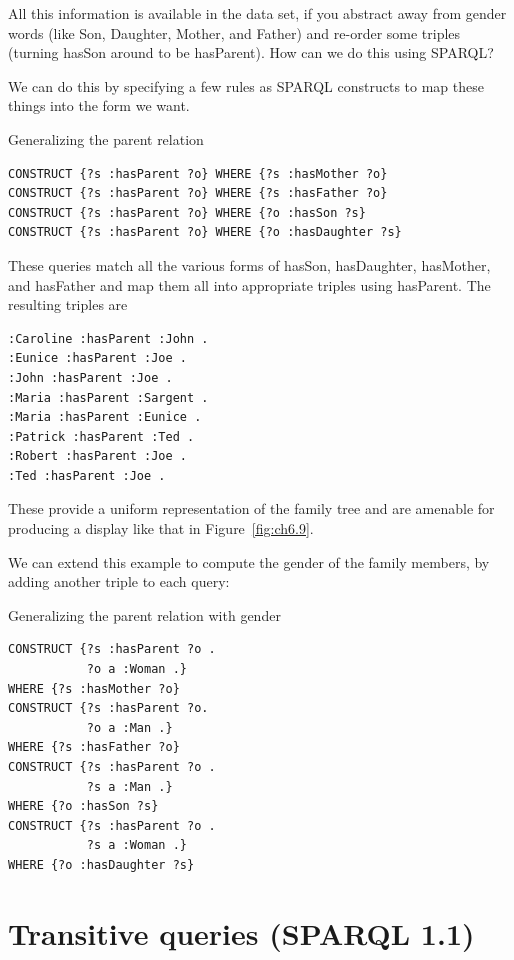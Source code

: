 \begin{challenge}
All this information is available in the data set, if you abstract away
from gender words (like Son, Daughter, Mother, and Father) and re-order
some triples (turning hasSon around to be hasParent). How can we do this
using SPARQL?

We can do this by specifying a few rules as SPARQL constructs to map
these things into the form we want.

\begin{query}Generalizing the parent relation\end{query}
\begin{lstlisting}
CONSTRUCT {?s :hasParent ?o} WHERE {?s :hasMother ?o} 
CONSTRUCT {?s :hasParent ?o} WHERE {?s :hasFather ?o} 
CONSTRUCT {?s :hasParent ?o} WHERE {?o :hasSon ?s} 
CONSTRUCT {?s :hasParent ?o} WHERE {?o :hasDaughter ?s}
\end{lstlisting}

These queries match all the various forms of hasSon, hasDaughter,
hasMother, and hasFather and map them all into appropriate triples using
hasParent. The resulting triples are


\begin{lstlisting}
:Caroline :hasParent :John .
:Eunice :hasParent :Joe .
:John :hasParent :Joe .
:Maria :hasParent :Sargent .
:Maria :hasParent :Eunice .
:Patrick :hasParent :Ted .
:Robert :hasParent :Joe .
:Ted :hasParent :Joe .
\end{lstlisting}

These provide a uniform representation of the family tree and are
amenable for producing a display like that in 
Figure~\ref{fig:ch6.9}.

We can extend this example to compute the gender of the family members,
by adding another triple to each query:

\begin{query}Generalizing the parent relation with gender\end{query}
\begin{lstlisting}
CONSTRUCT {?s :hasParent ?o .
           ?o a :Woman .}
WHERE {?s :hasMother ?o} 
CONSTRUCT {?s :hasParent ?o.
           ?o a :Man .} 
WHERE {?s :hasFather ?o} 
CONSTRUCT {?s :hasParent ?o .
           ?s a :Man .} 
WHERE {?o :hasSon ?s} 
CONSTRUCT {?s :hasParent ?o .
           ?s a :Woman .}
WHERE {?o :hasDaughter ?s}
\end{lstlisting}
\end{challenge}

\section{Transitive queries (SPARQL 1.1)}

